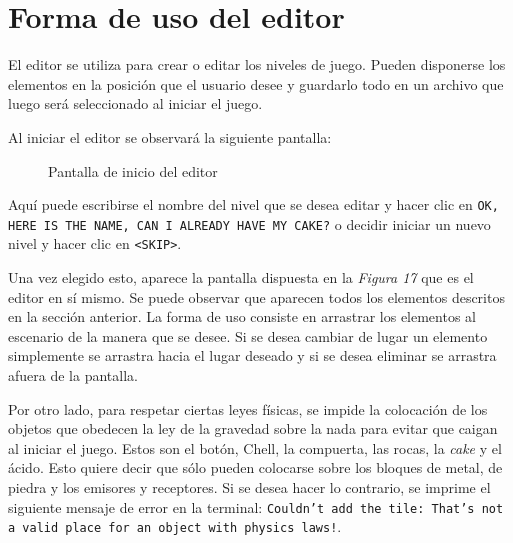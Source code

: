 \documentclass[a4paper]{article}
\begin{document}
\newpage 

\section{Forma de uso del editor}
El editor se utiliza para crear o editar los niveles de juego. Pueden disponerse los elementos en la posición que el usuario desee y guardarlo todo en un archivo que luego será seleccionado al iniciar el juego.

Al iniciar el editor se observará la siguiente pantalla:

\begin{figure}[!h]
	\caption{Pantalla de inicio del editor}
	\label{fig:diagrama17}
\end{figure}

Aquí puede escribirse el nombre del nivel que se desea editar y hacer clic en \texttt{OK, HERE IS THE NAME, CAN I ALREADY HAVE MY CAKE?} o decidir iniciar un nuevo nivel y hacer clic en \texttt{<SKIP>}. 

Una vez elegido esto, aparece la pantalla dispuesta en la \textit{Figura 17} que es el editor en sí mismo. Se puede observar que aparecen todos los elementos descritos en la sección anterior. La forma de uso consiste en arrastrar los elementos al escenario de la manera que se desee. Si se desea cambiar de lugar un elemento simplemente se arrastra hacia el lugar deseado y si se desea eliminar se arrastra afuera de la pantalla. 

Por otro lado, para respetar ciertas leyes físicas, se impide la colocación de los objetos que obedecen la ley de la gravedad sobre la nada para evitar que caigan al iniciar el juego. Estos son el botón, Chell, la compuerta, las rocas, la \textit{cake} y el ácido. Esto quiere decir que sólo pueden colocarse sobre los bloques de metal, de piedra y los emisores y receptores. Si se desea hacer lo contrario, se imprime el siguiente mensaje de error en la terminal: \texttt{Couldn't add the tile: That's not a valid place for an object with physics laws!}.
\end{document}
